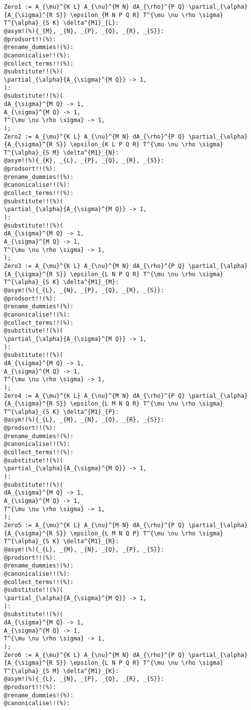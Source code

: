 \documentclass[11pt]{article}
\begin{document}
{\color[named]{Blue}\begin{verbatim}
Zero1 := A_{\mu}^{K L} A_{\nu}^{M N} dA_{\rho}^{P Q} \partial_{\alpha}{A_{\sigma}^{R S}} \epsilon_{M N P Q R} T^{\mu \nu \rho \sigma} T^{\alpha}_{S K} \delta^{M1}_{L}:
@asym!(%){_{M}, _{N}, _{P}, _{Q}, _{R}, _{S}}:
@prodsort!!(%):
@rename_dummies!(%):
@canonicalise!!(%):
@collect_terms!!(%):
@substitute!!(%)(
\partial_{\alpha}{A_{\sigma}^{M Q}} -> 1,
):
@substitute!!(%)(
dA_{\sigma}^{M Q} -> 1,
A_{\sigma}^{M Q} -> 1,
T^{\mu \nu \rho \sigma} -> 1,
);
Zero2 := A_{\mu}^{K L} A_{\nu}^{M N} dA_{\rho}^{P Q} \partial_{\alpha}{A_{\sigma}^{R S}} \epsilon_{K L P Q R} T^{\mu \nu \rho \sigma} T^{\alpha}_{S M} \delta^{M1}_{N}:
@asym!(%){_{K}, _{L}, _{P}, _{Q}, _{R}, _{S}}:
@prodsort!!(%):
@rename_dummies!(%):
@canonicalise!!(%):
@collect_terms!!(%):
@substitute!!(%)(
\partial_{\alpha}{A_{\sigma}^{M Q}} -> 1,
):
@substitute!!(%)(
dA_{\sigma}^{M Q} -> 1,
A_{\sigma}^{M Q} -> 1,
T^{\mu \nu \rho \sigma} -> 1,
);
Zero3 := A_{\mu}^{K L} A_{\nu}^{M N} dA_{\rho}^{P Q} \partial_{\alpha}{A_{\sigma}^{R S}} \epsilon_{L N P Q R} T^{\mu \nu \rho \sigma} T^{\alpha}_{S K} \delta^{M1}_{M}:
@asym!(%){_{L}, _{N}, _{P}, _{Q}, _{R}, _{S}}:
@prodsort!!(%):
@rename_dummies!(%):
@canonicalise!!(%):
@collect_terms!!(%):
@substitute!!(%)(
\partial_{\alpha}{A_{\sigma}^{M Q}} -> 1,
):
@substitute!!(%)(
dA_{\sigma}^{M Q} -> 1,
A_{\sigma}^{M Q} -> 1,
T^{\mu \nu \rho \sigma} -> 1,
);
Zero4 := A_{\mu}^{K L} A_{\nu}^{M N} dA_{\rho}^{P Q} \partial_{\alpha}{A_{\sigma}^{R S}} \epsilon_{L M N Q R} T^{\mu \nu \rho \sigma} T^{\alpha}_{S K} \delta^{M1}_{P}:
@asym!(%){_{L}, _{M}, _{N}, _{Q}, _{R}, _{S}}:
@prodsort!!(%):
@rename_dummies!(%):
@canonicalise!!(%):
@collect_terms!!(%):
@substitute!!(%)(
\partial_{\alpha}{A_{\sigma}^{M Q}} -> 1,
):
@substitute!!(%)(
dA_{\sigma}^{M Q} -> 1,
A_{\sigma}^{M Q} -> 1,
T^{\mu \nu \rho \sigma} -> 1,
);
Zero5 := A_{\mu}^{K L} A_{\nu}^{M N} dA_{\rho}^{P Q} \partial_{\alpha}{A_{\sigma}^{R S}} \epsilon_{L M N Q P} T^{\mu \nu \rho \sigma} T^{\alpha}_{S K} \delta^{M1}_{R}:
@asym!(%){_{L}, _{M}, _{N}, _{Q}, _{P}, _{S}}:
@prodsort!!(%):
@rename_dummies!(%):
@canonicalise!!(%):
@collect_terms!!(%):
@substitute!!(%)(
\partial_{\alpha}{A_{\sigma}^{M Q}} -> 1,
):
@substitute!!(%)(
dA_{\sigma}^{M Q} -> 1,
A_{\sigma}^{M Q} -> 1,
T^{\mu \nu \rho \sigma} -> 1,
);
Zero6 := A_{\mu}^{K L} A_{\nu}^{M N} dA_{\rho}^{P Q} \partial_{\alpha}{A_{\sigma}^{R S}} \epsilon_{L N P Q R} T^{\mu \nu \rho \sigma} T^{\alpha}_{S M} \delta^{M1}_{K}:
@asym!(%){_{L}, _{N}, _{P}, _{Q}, _{R}, _{S}}:
@prodsort!!(%):
@rename_dummies!(%):
@canonicalise!!(%):

\end{verbatim}}
\end{document}
